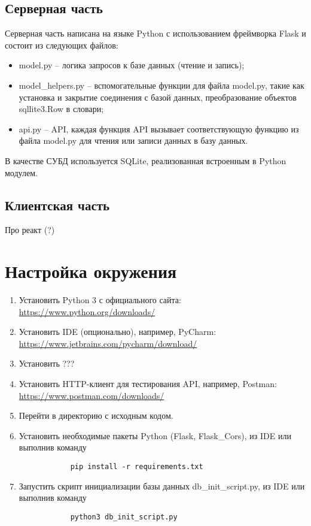 \documentclass[a4paper,12pt]{report} %
\begin{document}
	\subsection{Серверная часть}
	Серверная часть написана на языке Python с использованием фреймворка Flask и состоит из следующих файлов:
	\begin{itemize}
		\item model.py -- логика запросов к базе данных (чтение и запись);
		\item model\_helpers.py -- вспомогательные функции для файла model.py, такие как установка и закрытие соединения с базой данных, преобразование объектов sqllite3.Row в словари;
		\item api.py -- API, каждая функция API вызывает соответствующую функцию из файла model.py для чтения или записи данных в базу данных.
	\end{itemize}
    В качестве СУБД используется SQLite, реализованная встроенным в Python модулем.
	\subsection{Клиентская часть}
	Про реакт (?)
	\section{Настройка окружения}
	\begin{enumerate}
		\item Установить Python 3 с официального сайта: \url{https://www.python.org/downloads/}
		\item Установить IDE (опционально), например, PyCharm: \url{https://www.jetbrains.com/pycharm/download/} 
		\item Установить ???
		\item Установить HTTP-клиент для тестирования API, например, Postman: \url{https://www.postman.com/downloads/}
		\item Перейти в директорию с исходным кодом.
		\item Установить необходимые пакеты Python (Flask, Flask\_Cors), из IDE или выполнив команду
		\begin{verbatim}
			pip install -r requirements.txt
		\end{verbatim}
	    \item Запустить скрипт инициализации базы данных db\_init\_script.py, из IDE или выполнив команду
	    \begin{verbatim}
	    	python3 db_init_script.py
	    \end{verbatim}
	\end{enumerate}
\end{document}
